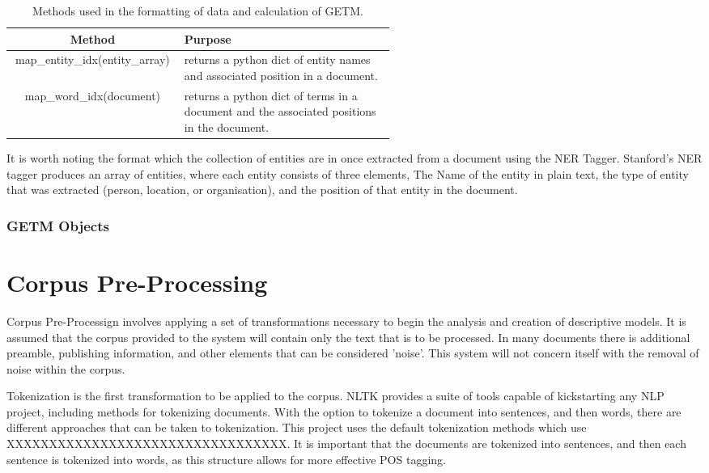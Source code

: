 \documentclass[10pt]{report}
\begin{document}
\renewcommand{\baselinestretch}{1.0}\normalsize
\renewcommand{\arraystretch}{2.0}
\begin{table}[h!]
  \begin{tabular}{ c | p{0.55\linewidth}}
  
  Method & Purpose\\
    \hline
    map\_entity\_idx(entity\_array) & returns a python dict of entity names and associated position in a document.\\ 
    map\_word\_idx(document) & returns a python dict of terms in a document and the associated positions in the document.
  \end{tabular}
  \caption{Methods used in the formatting of data and calculation of GETM.\label{tab:getm_methods}}
\end{table}
\renewcommand{\baselinestretch}{2.0}\normalsize
\renewcommand{\arraystretch}{1.0}

It is worth noting the format which the collection of entities are in once extracted from a document using the NER Tagger. Stanford's NER tagger produces an array of entities, where each entity consists of three elements, The Name of the entity in plain text, the type of entity that was extracted (person, location, or organisation), and the position of that entity in the document. 

\subsubsection{GETM Objects}



\section{Corpus Pre-Processing}

Corpus Pre-Processign involves applying a set of transformations necessary to begin the analysis and creation of descriptive models. It is assumed that the corpus provided to the system will contain only the text that is to be processed. In many documents there is additional preamble, publishing information, and other elements that can be considered 'noise'. This system will not concern itself with the removal of noise within the corpus.

Tokenization is the first transformation to be applied to the corpus. NLTK provides a suite of tools capable of kickstarting any NLP project, including methods for tokenizing documents. With the option to tokenize a document into sentences, and then words, there are different approaches that can be taken to tokenization. This project uses the default tokenization methods which use XXXXXXXXXXXXXXXXXXXXXXXXXXXXXXXXX. It is important that the documents are tokenized into sentences, and then each sentence is tokenized into words, as this structure allows for more effective POS tagging.
\end{document}

